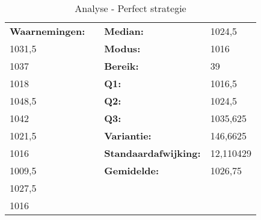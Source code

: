 \documentclass[conference]{IEEEtran}
\begin{document}
\begin{table}[htbp]
\caption{Analyse - Perfect strategie}
\tiny
\centering
\begin{tabular}{|l|lll}
\cline{1-1} \cline{3-4}
\textbf{Waarnemingen:} & \multicolumn{1}{l|}{} & \multicolumn{1}{l|}{\textbf{Median:}} & \multicolumn{1}{l|}{1024,5} \\ \cline{1-1} \cline{3-4} 
1031,5 & \multicolumn{1}{l|}{} & \multicolumn{1}{l|}{\textbf{Modus:}} & \multicolumn{1}{l|}{1016} \\ \cline{1-1} \cline{3-4} 
1037 & \multicolumn{1}{l|}{} & \multicolumn{1}{l|}{\textbf{Bereik:}} & \multicolumn{1}{l|}{39} \\ \cline{1-1} \cline{3-4} 
1018 & \multicolumn{1}{l|}{} & \multicolumn{1}{l|}{\textbf{Q1:}} & \multicolumn{1}{l|}{1016,5} \\ \cline{1-1} \cline{3-4} 
1048,5 & \multicolumn{1}{l|}{} & \multicolumn{1}{l|}{\textbf{Q2:}} & \multicolumn{1}{l|}{1024,5} \\ \cline{1-1} \cline{3-4} 
1042 & \multicolumn{1}{l|}{} & \multicolumn{1}{l|}{\textbf{Q3:}} & \multicolumn{1}{l|}{1035,625} \\ \cline{1-1} \cline{3-4} 
1021,5 & \multicolumn{1}{l|}{} & \multicolumn{1}{l|}{\textbf{Variantie:}} & \multicolumn{1}{l|}{146,6625} \\ \cline{1-1} \cline{3-4} 
1016 & \multicolumn{1}{l|}{} & \multicolumn{1}{l|}{\textbf{Standaardafwijking:}} & \multicolumn{1}{l|}{12,110429} \\ \cline{1-1} \cline{3-4} 
1009,5 & \multicolumn{1}{l|}{} & \multicolumn{1}{l|}{\textbf{Gemidelde:}} & \multicolumn{1}{l|}{1026,75} \\ \cline{1-1} \cline{3-4} 
1027,5 &  &  &  \\ \cline{1-1}
1016 &  & \textbf{} &  \\ \cline{1-1}
\end{tabular}
\end{table}
\end{document}
